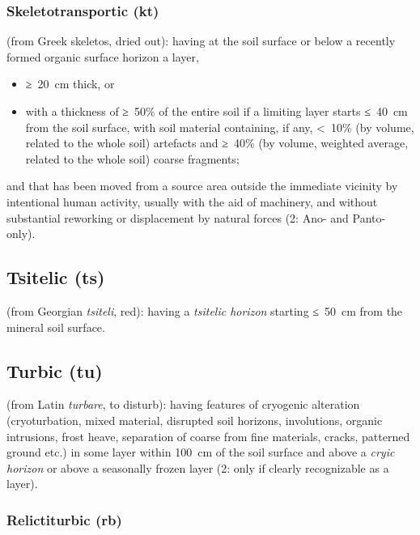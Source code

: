 \documentclass[
  letterpaper,
  DIV=11,
  numbers=noendperiod]{scrreprt}
\providecommand{\tightlist}{%
  \setlength{\itemsep}{0pt}\setlength{\parskip}{0pt}}\usepackage{longtable,booktabs,array}
\begin{document}
\hypertarget{skeletotransportic-kt}{%
\subsubsection{Skeletotransportic (kt)}\label{skeletotransportic-kt}}

(from Greek skeletos, dried out): having at the soil surface or below a
recently formed organic surface horizon a layer,

\begin{itemize}
\tightlist
\item
  ≥~20~cm thick, or
\item
  with a thickness of ≥~50\% of the entire soil if a limiting layer
  starts ≤~40~cm from the soil surface, with soil material containing,
  if any, \textless~10\% (by volume, related to the whole soil)
  artefacts and ≥~40\% (by volume, weighted average, related to the
  whole soil) coarse fragments;
\end{itemize}

and that has been moved from a source area outside the immediate
vicinity by intentional human activity, usually with the aid of
machinery, and without substantial reworking or displacement by natural
forces (2: Ano- and Panto- only).

\hypertarget{tsitelic-ts}{%
\subsection{Tsitelic (ts)}\label{tsitelic-ts}}

(from Georgian \emph{tsiteli}, red): having a \emph{tsitelic horizon}
starting ≤~50~cm from the mineral soil surface.

\hypertarget{turbic-tu}{%
\subsection{Turbic (tu)}\label{turbic-tu}}

(from Latin \emph{turbare}, to disturb): having features of cryogenic
alteration (cryoturbation, mixed material, disrupted soil horizons,
involutions, organic intrusions, frost heave, separation of coarse from
fine materials, cracks, patterned ground etc.) in some layer within
100~cm of the soil surface and above a \emph{cryic horizon} or above a
seasonally frozen layer (2: only if clearly recognizable as a layer).

\hypertarget{relictiturbic-rb}{%
\subsubsection{Relictiturbic (rb)}\label{relictiturbic-rb}}
\end{document}
